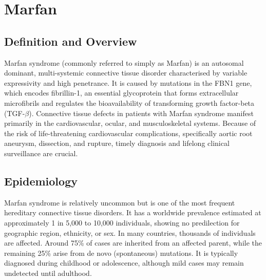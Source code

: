 \chapter{Marfan}

\section*{Definition and Overview}
Marfan syndrome (commonly referred to simply as Marfan) is an autosomal dominant, multi-systemic connective tissue disorder characterised by variable expressivity and high penetrance. It is caused by mutations in the FBN1 gene, which encodes fibrillin-1, an essential glycoprotein that forms extracellular microfibrils and regulates the bioavailability of transforming growth factor-beta (TGF-$\beta$). Connective tissue defects in patients with Marfan syndrome manifest primarily in the cardiovascular, ocular, and musculoskeletal systems. Because of the risk of life-threatening cardiovascular complications, specifically aortic root aneurysm, dissection, and rupture, timely diagnosis and lifelong clinical surveillance are crucial.

\section*{Epidemiology}
Marfan syndrome is relatively uncommon but is one of the most frequent hereditary connective tissue disorders. It has a worldwide prevalence estimated at approximately 1 in 5,000 to 10,000 individuals, showing no predilection for geographic region, ethnicity, or sex. In many countries, thousands of individuals are affected. Around 75\% of cases are inherited from an affected parent, while the remaining 25\% arise from de novo (spontaneous) mutations. It is typically diagnosed during childhood or adolescence, although mild cases may remain undetected until adulthood.

